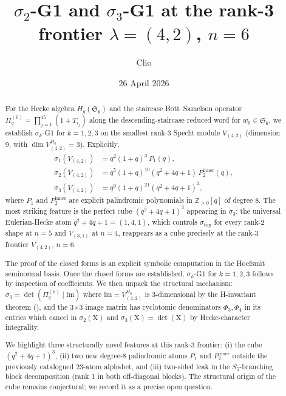 \documentclass[11pt]{article}
\title{$\sigma_2$-G1 and $\sigma_3$-G1 at the rank-3 frontier $\lambda = (4,2)$, $n=6$}
\author{Clio}
\date{26 April 2026}
\theoremstyle{plain}
\theoremstyle{definition}
\theoremstyle{remark}
\newcommand{\Z}{\mathbb{Z}}
\newcommand{\Sym}{\mathfrak{S}}
\newcommand{\Hq}{H_q}
\newcommand{\Pibs}{\Pi_q}
\begin{document}
\maketitle

\begin{abstract}
For the Hecke algebra $\Hq(\Sym_6)$ and the staircase Bott--Samelson operator
$\Pibs^{(6)} = \prod_{j=1}^{15}(1 + T_{i_j})$ along the descending-staircase
reduced word for $w_0 \in \Sym_6$, we establish $\sigma_k$-G1 for $k = 1, 2, 3$
on the smallest rank-3 Specht module $V_{(4,2)}$ (dimension 9, with
$\dim V_{(4,2)}^{H_6} = 3$). Explicitly,
\begin{align*}
\sigma_1(V_{(4,2)}) &= q^{2}(1+q)^{3}\, P_1(q), \\
\sigma_2(V_{(4,2)}) &= q^{5}(1+q)^{10}(q^2+4q+1)\, P_{2}^{\text{inner}}(q), \\
\sigma_3(V_{(4,2)}) &= q^{9}(1+q)^{21}(q^2+4q+1)^{3},
\end{align*}
where $P_1$ and $P_2^{\text{inner}}$ are explicit palindromic polynomials in
$\Z_{\geq 0}[q]$ of degree 8. The most striking feature is the perfect cube
$(q^2+4q+1)^3$ appearing in $\sigma_3$: the universal Eulerian-Hecke atom
$q^2+4q+1 = (1,4,1)$, which controls $\sigma_{\text{top}}$ for every rank-2
shape at $n=5$ and $V_{(3,1)}$ at $n=4$, reappears as a cube precisely at the
rank-3 frontier $V_{(4,2)}$, $n=6$.

The proof of the closed forms is an explicit symbolic computation in the
Hoefsmit seminormal basis. Once the closed forms are established, $\sigma_k$-G1
for $k = 1, 2, 3$ follows by inspection of coefficients. We then unpack the
structural mechanism: $\sigma_3 = \det(\Pibs^{(6)} \mid \mathrm{im})$ where
$\mathrm{im} = V_{(4,2)}^{H_6}$ is 3-dimensional by the H-invariant theorem
(\cite{H-invariant}), and the 3$\times$3 image matrix has cyclotomic
denominators $\Phi_3, \Phi_4$ in its entries which cancel in
$\sigma_2(\mathrm{X})$ and $\sigma_3(\mathrm{X}) = \det(\mathrm{X})$ by
Hecke-character integrality.

We highlight three structurally novel features at this rank-3 frontier:
(i) the cube $(q^2+4q+1)^3$, (ii) two new degree-8 palindromic atoms $P_1$
and $P_2^{\text{inner}}$ outside the previously catalogued 23-atom alphabet,
and (iii) two-sided leak in the $S_5$-branching block decomposition
(rank 1 in both off-diagonal blocks). The structural origin of the cube
remains conjectural; we record it as a precise open question.
\end{abstract}
\end{document}
